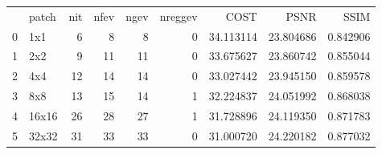 \begin{tabular}{llrrrrrrr}
 & patch & nit & nfev & ngev & nreggev & COST & PSNR & SSIM \\
0 & 1x1 & 6 & 8 & 8 & 0 & 34.113114 & 23.804686 & 0.842906 \\
1 & 2x2 & 9 & 11 & 11 & 0 & 33.675627 & 23.860742 & 0.855044 \\
2 & 4x4 & 12 & 14 & 14 & 0 & 33.027442 & 23.945150 & 0.859578 \\
3 & 8x8 & 13 & 15 & 14 & 1 & 32.224837 & 24.051992 & 0.868038 \\
4 & 16x16 & 26 & 28 & 27 & 1 & 31.728896 & 24.119350 & 0.871783 \\
5 & 32x32 & 31 & 33 & 33 & 0 & 31.000720 & 24.220182 & 0.877032 \\
\end{tabular}

